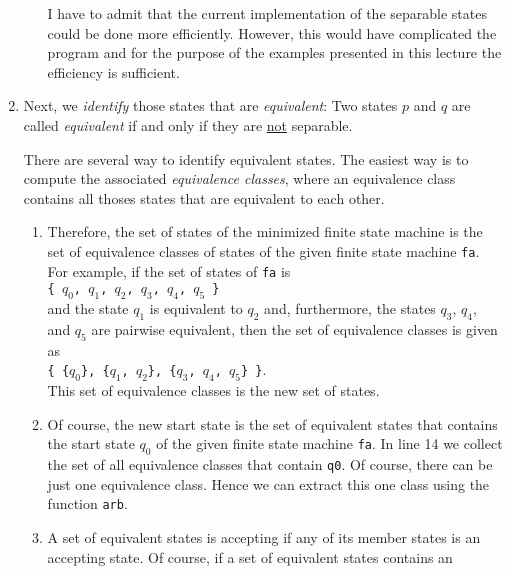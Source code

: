 \begin{enumerate}
\begin{enumerate}
           I have to admit that the current implementation of the separable states could be done 
           more efficiently.  However, this would have complicated the program and for the purpose 
           of the examples presented in this lecture the efficiency is sufficient.
      \end{enumerate}
\item Next, we \emph{identify} those states that are \emph{equivalent}: Two states
      $p$ and $q$ are called \emph{equivalent} if and only if they are
      \underline{not} separable.  
 
      There are several way to identify equivalent states.  The easiest way is to compute
      the associated \emph{equivalence classes}, where an equivalence class contains all
      thoses states that are equivalent to each other.
      \begin{enumerate}
      \item Therefore, the set of states of the minimized finite state machine is the set
            of equivalence classes of states of the given finite state machine
            \texttt{fa}.   For example, if the set of states of \texttt{fa} is
            \\[0.2cm]
            \hspace*{1.3cm}
            \texttt{\{ $q_0$, $q_1$, $q_2$, $q_3$, $q_4$, $q_5$ \}}
            \\[0.2cm]
            and the state $q_1$ is equivalent to  $q_2$ and, furthermore, the states
            $q_3$, $q_4$, and $q_5$ are pairwise equivalent, then the set of equivalence
            classes is given as
            \\[0.2cm]
            \hspace*{1.3cm}
            \texttt{\{ \{$q_0$\}, \{$q_1$, $q_2$\}, \{$q_3$, $q_4$, $q_5$\} \}}.
            \\[0.2cm]
            This set of equivalence classes is the new set of states.
      \item Of course, the new start state is the set of equivalent states that contains
            the start state $q_0$ of the given finite state machine \texttt{fa}.
            In line 14 we collect the set of all equivalence classes that contain \texttt{q0}.
            Of course, there can be just one equivalence class.  Hence we can extract this one
            class using the function \texttt{arb}.
      \item A set of equivalent states is accepting if any of its member states is an
            accepting state.  Of course, if a set of equivalent states contains an

\end{enumerate}
\end{enumerate}
